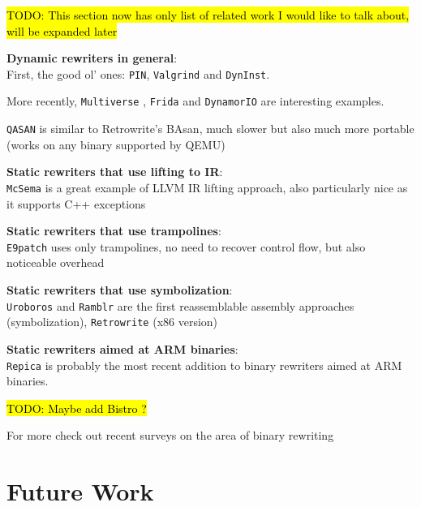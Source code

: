 \documentclass[a4paper,11pt,oneside]{report}
\newcommand{\todo}[1]{%
	\begingroup 
	\sethlcolor{cyan}%
	\hl{TODO: #1}%
	\endgroup
}
\begin{document}
{

\setlength{\parindent}{0cm}

\todo{This section now has only list of related work I would like to talk 
about, will be expanded later}



\textbf{Dynamic rewriters in general}:\\
First, the good ol' ones: \texttt{PIN}\cite{pin}, 
\texttt{Valgrind}\cite{valgrind} and \texttt{DynInst}\cite{dyninst}.

More recently, \texttt{Multiverse} \cite{multiverse}, \texttt{Frida} and 
\texttt{DynamorIO} are interesting examples.

\texttt{QASAN}\cite{qasan} is similar to Retrowrite's BAsan, much slower but 
also much more portable (works on any binary supported by QEMU)



\textbf{Static rewriters that use lifting to IR}:\\
\texttt{McSema} \cite{mcsema} is a great example of LLVM IR lifting approach, 
also particularly nice as it supports C++ exceptions

\textbf{Static rewriters that use trampolines}:\\
\texttt{E9patch}\cite{e9patch} uses only trampolines, no need to recover 
control flow, but also noticeable overhead


\textbf{Static rewriters that use symbolization}:\\
\texttt{Uroboros}\cite{uroboros} and \texttt{Ramblr}\cite{ramblr} are the first 
reassemblable assembly approaches (symbolization), \texttt{Retrowrite} 
\cite{dinesh20oakland} (x86 version)

\textbf{Static rewriters aimed at ARM binaries}:\\
\texttt{Repica} \cite{repica} is probably the most recent addition to binary 
rewriters aimed at ARM binaries.  

\todo{Maybe add Bistro ? } \cite{bistro}

For more check out recent surveys on the area of binary rewriting 
\cite{binaryrewritingsurvey}

}

\chapter{Future Work}
\end{document}
